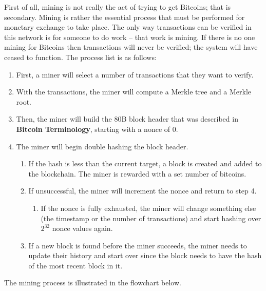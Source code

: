 \documentclass[pdftex,11pt]{article}
\begin{document}
First of all, mining is not really the act of trying to get Bitcoins; that is secondary. Mining is rather the essential process that must be performed for monetary exchange to take place. The only way transactions can be verified in this network is for someone to do work -- that work is mining. If there is no one mining for Bitcoins then transactions will never be verified; the system will have ceased to function.
The process list is as follows:
\begin{enumerate}
	\item First, a miner will select a number of transactions that they want to verify.
	\item With the transactions, the miner will compute a Merkle tree and a Merkle root.
	\item Then, the miner will build the 80B block header that was described in {\bf Bitcoin Terminology}, starting with a nonce of 0.
	\item The miner will begin double hashing the block header.
	\begin{enumerate}
		\item If the hash is less than the current target, a block is created and added to the blockchain. The miner is rewarded with a set number of bitcoins.
		\item If unsuccessful, the miner will increment the nonce and return to step 4.
		\begin{enumerate}
			\item If the nonce is fully exhausted, the miner will change something else (the timestamp or the number of transactions) and start hashing over $2^{32}$ nonce values again.
		\end{enumerate}
		\item If a new block is found before the miner succeeds, the miner needs to update their history and start over since the block needs to have the hash of the most recent block in it.
	\end{enumerate}
\end{enumerate}

The mining process is illustrated in the flowchart below.
\end{document}
